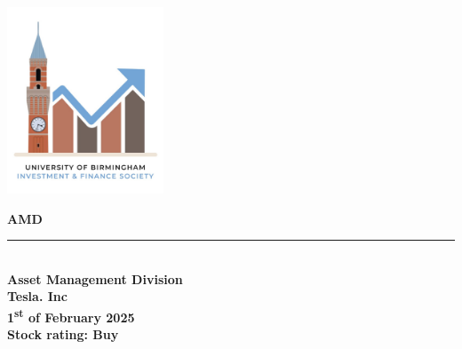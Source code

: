 \documentclass[12pt]{article}
\begin{document}
\begin{center}
    \includegraphics[width=0.35\textwidth]{BIFS_Logo1.JPG} %
\end{center}

\vspace*{1cm}


\begin{center}
    {\fontsize{72}{72}\selectfont \textcolor[rgb]{0.1, 0.2, 0.5}{\Huge \textbf{AMD}}}\\
    \color[rgb]{1.0, 0.8, 0.0}\rule{0.4\textwidth}{1pt} \\[10pt] %
    \textcolor[rgb]{0.1, 0.2, 0.5}{\textbf{\large Asset Management Division}} \\[20pt]
    \vspace*{2cm}
    {\textcolor[rgb]{0.0, 0.0, 0.0}{\Large \textbf{Tesla. Inc}}} \\[10pt]
    {\textcolor[rgb]{0.3, 0.3, 0.3}{\textbf{\normalsize 1\textsuperscript{st} of February 2025}}} \\[20pt]
    {\textcolor[rgb]{0.0, 0.0, 0.0}{\Large \textbf{Stock rating: Buy}}}
    \vspace*{2cm}
\end{center}

\vspace{1cm}

\end{document}
